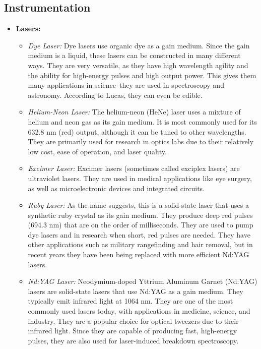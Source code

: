 \documentclass[%
 reprint,
superscriptaddress,
 amsmath,amssymb,
 aps,
prc,
]{revtex4-1}
\begin{document}
\subsection{Instrumentation}
\begin{itemize}
	\item \textbf{Lasers:}
	\begin{itemize}
		\item \textit{Dye Laser:} Dye lasers use organic dye as a gain medium. Since the gain medium is a liquid, these lasers can be constructed in many different ways. They are very versatile, as they have high wavelength agility and the ability for high-energy pulses and high output power. This gives them many applications in science--they are used in spectroscopy and astronomy. According to Lucas, they can even be edible.
		
		\item \textit{Helium-Neon Laser:} The helium-neon (HeNe) laser uses a mixture of helium and neon gas as its gain medium. It is most commonly used for its 632.8 nm (red) output, although it can be tuned to other wavelengths. They are primarily used for research in optics labs due to their relatively low cost, ease of operation, and laser quality.
		
		\item \textit{Excimer Laser:} Excimer lasers (sometimes called exciplex lasers) are ultraviolet lasers. They are used in medical applications like eye surgery, as well as microelectronic devices and integrated circuits.
		
		\item \textit{Ruby Laser:} As the name suggests, this is a solid-state laser that uses a synthetic ruby crystal as its gain medium. They produce deep red pulses (694.3 nm) that are on the order of milliseconds. They are used to pump dye lasers and in research when short, red pulses are needed. They have other applications such as military rangefinding and hair removal, but in recent years they have been being replaced with more efficient Nd:YAG lasers.
		
		\item \textit{Nd:YAG Laser:} Neodymium-doped Yttrium Aluminum Garnet (Nd:YAG) lasers are solid-state lasers that use Nd:YAG as a gain medium. They typically emit infrared light at 1064 nm. They are one of the most commonly used lasers today, with applications in medicine, science, and industry. They are a popular choice for optical tweezers due to their infrared light. Since they are capable of producing fast, high-energy pulses, they are also used for laser-induced breakdown spectroscopy.
	\end{itemize}


\end{itemize}
\end{document}

